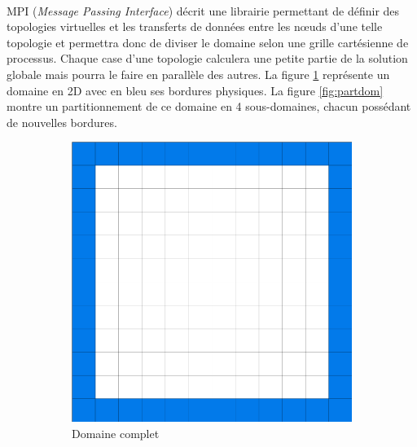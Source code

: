 \paragraph{}MPI (\textit{Message Passing Interface}) décrit une librairie permettant de définir des topologies virtuelles et les transferts de données entre les nœuds d'une telle topologie et permettra donc de diviser le domaine selon une grille cartésienne de processus. Chaque case d'une topologie calculera une petite partie de la solution globale mais pourra le faire en parallèle des autres. La figure \ref{fig:globaldom} représente un domaine en 2D avec en bleu ses bordures physiques. La figure \ref{fig:partdom} montre un partitionnement de ce domaine en 4 sous-domaines, chacun possédant de nouvelles bordures.


\begin{figure}[!ht]
  \centering
  \begin{subfigure}[b]{0.5\textwidth}
    \centering
    \includegraphics[scale=0.15]{figures/globaldomain.png}
  \caption{\label{fig:globaldom}Domaine complet}
  \end{subfigure}%
  ~
  \begin{subfigure}[b]{0.5\textwidth}
    \centering

\end{subfigure}
\end{figure}
